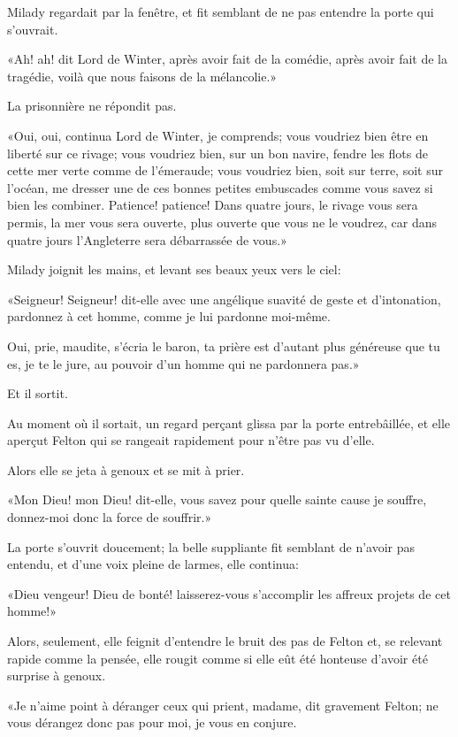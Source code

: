 Milady regardait par la fenêtre, et fit semblant de ne pas entendre la porte qui s'ouvrait. 

«Ah! ah! dit Lord de Winter, après avoir fait de la comédie, après avoir fait de la tragédie, voilà que nous faisons de la mélancolie.» 

La prisonnière ne répondit pas. 

«Oui, oui, continua Lord de Winter, je comprends; vous voudriez bien être en liberté sur ce rivage; vous voudriez bien, sur un bon navire, fendre les flots de cette mer verte comme de l'émeraude; vous voudriez bien, soit sur terre, soit sur l'océan, me dresser une de ces bonnes petites embuscades comme vous savez si bien les combiner. Patience! patience! Dans quatre jours, le rivage vous sera permis, la mer vous sera ouverte, plus ouverte que vous ne le voudrez, car dans quatre jours l'Angleterre sera débarrassée de vous.» 

Milady joignit les mains, et levant ses beaux yeux vers le ciel: 

«Seigneur! Seigneur! dit-elle avec une angélique suavité de geste et d'intonation, pardonnez à cet homme, comme je lui pardonne moi-même. 

\speak  Oui, prie, maudite, s'écria le baron, ta prière est d'autant plus généreuse que tu es, je te le jure, au pouvoir d'un homme qui ne pardonnera pas.» 

Et il sortit. 

Au moment où il sortait, un regard perçant glissa par la porte entrebâillée, et elle aperçut Felton qui se rangeait rapidement pour n'être pas vu d'elle. 

Alors elle se jeta à genoux et se mit à prier. 

«Mon Dieu! mon Dieu! dit-elle, vous savez pour quelle sainte cause je souffre, donnez-moi donc la force de souffrir.» 

La porte s'ouvrit doucement; la belle suppliante fit semblant de n'avoir pas entendu, et d'une voix pleine de larmes, elle continua: 

«Dieu vengeur! Dieu de bonté! laisserez-vous s'accomplir les affreux projets de cet homme!» 

Alors, seulement, elle feignit d'entendre le bruit des pas de Felton et, se relevant rapide comme la pensée, elle rougit comme si elle eût été honteuse d'avoir été surprise à genoux. 

«Je n'aime point à déranger ceux qui prient, madame, dit gravement Felton; ne vous dérangez donc pas pour moi, je vous en conjure. 


